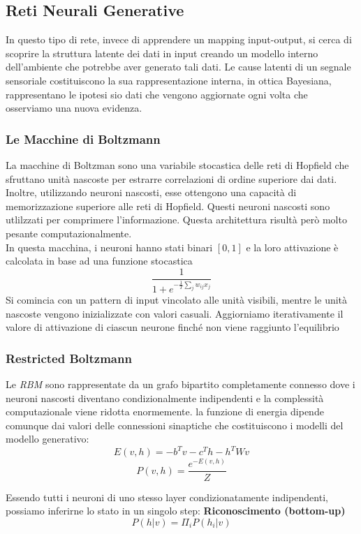 \documentclass[12pt, a4paper]{article}
\begin{document}
\subsection{Reti Neurali Generative}
In questo tipo di rete, invece di apprendere un mapping input-output, si cerca di scoprire la struttura latente dei dati in input creando un modello interno dell'ambiente che potrebbe aver generato tali dati. Le cause latenti di un segnale sensoriale costituiscono la sua rappresentazione interna, in ottica Bayesiana, rappresentano le ipotesi sio dati che vengono aggiornate ogni volta che osserviamo una nuova evidenza.\\

\subsubsection{Le Macchine di Boltzmann}
La macchine di Boltzman sono una variabile stocastica delle reti di Hopfield che sfruttano unità nascoste per estrarre correlazioni di ordine superiore dai dati. Inoltre, utilizzando neuroni nascosti, esse ottengono una capacità di memorizzazione superiore alle reti di Hopfield. Questi neuroni nascosti sono utlilzzati per comprimere l'informazione. Questa architettura risultà però molto pesante computazionalmente.
\\
In questa macchina, i neuroni hanno stati binari \([0, 1]\) e la loro attivazione è calcolata in base ad una funzione stocastica
\[\frac{1}{1+e^{-\frac{1}{T} \sum_j w_{ij}x_j}}\]
Si comincia con un pattern di input vincolato alle unità visibili, mentre le unità nascoste vengono inizializzate con valori casuali. Aggiorniamo iterativamente il valore di attivazione di ciascun neurone finché non viene raggiunto l'equilibrio

\subsubsection{Restricted Boltzmann}
Le \textit{RBM} sono rappresentate da un grafo bipartito completamente connesso dove i neuroni nascosti diventano condizionalmente indipendenti e la complessità computazionale viene ridotta enormemente. la funzione di energia dipende comunque dai valori delle connessioni sinaptiche che costituiscono i modelli del modello generativo:
\[E(v, h) = -b^Tv-c^Th-h^TWv\]
\[P(v, h) = \frac{e^{-E(v,h)}}{Z}\]

Essendo tutti i neuroni di uno stesso layer condizionatamente indipendenti, possiamo inferirne lo stato in un singolo step:
\textbf{Riconoscimento (bottom-up)}
\[P(h|v) = \Pi_i P(h_i|v)\]
\end{document}
